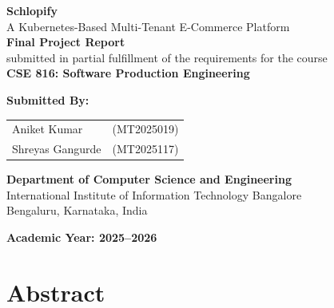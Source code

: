\documentclass[12pt,a4paper]{report}
\begin{document}

\begin{titlepage}
    \centering
    
    \vspace*{1cm}
    
    {\Huge \textbf{Schlopify}}\\[0.5cm]
    
    {\Large A Kubernetes-Based Multi-Tenant E-Commerce Platform}\\[1.5cm]
    
    \textbf{Final Project Report}\\[0.3cm]
    submitted in partial fulfillment of the requirements for the course\\[0.2cm]
    
    {\Large \textbf{CSE 816: Software Production Engineering}}\\[1.5cm]
    
    \vfill
    
    \textbf{Submitted By:}\\[0.5cm]
    
    \begin{tabular}{ll}
        Aniket Kumar & (MT2025019) \\
        Shreyas Gangurde & (MT2025117) \\
    \end{tabular}
    
    \vspace{1.5cm}
    
    \textbf{Department of Computer Science and Engineering}\\
    International Institute of Information Technology Bangalore\\
    Bengaluru, Karnataka, India
    
    \vfill
    
    \textbf{Academic Year: 2025--2026}
    
\end{titlepage}

\tableofcontents
\newpage



\chapter*{Abstract}
\end{document}
